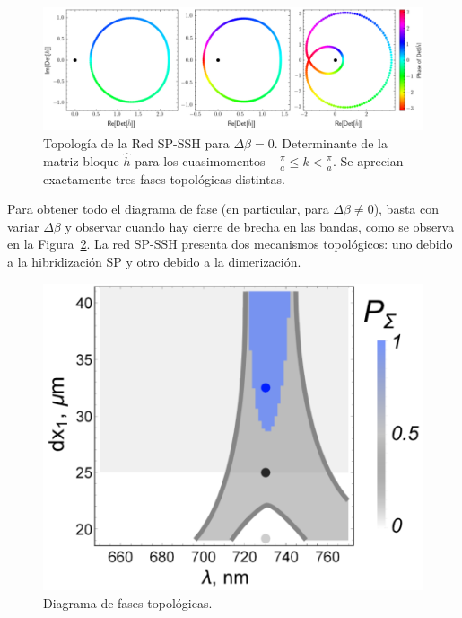 \begin{figure}[H]
	\centering
	\includegraphics[width=\linewidth]{media/sp-ssh-012.png}
	\caption[Topología de la Red SP-SSH para $\Delta\beta = 0$.]{Topología de la Red SP-SSH para $\Delta\beta = 0$. Determinante de la matriz-bloque $\hat{h}$ para los cuasimomentos $-\frac{\pi}{a} \le k  < \frac{\pi}{a}$. Se aprecian exactamente tres fases topológicas distintas. \label{fig:sp-wilson}}
\end{figure} \vspace{-8ex}
Para obtener todo el diagrama de fase (en particular, para $\Delta \beta \neq 0$), basta con variar $\Delta \beta$ y observar cuando hay cierre de brecha en las bandas, como se observa en la Figura~\ref{fig:sp-ssh-phase-diagram}.  La red SP-SSH presenta dos mecanismos topológicos: uno debido a la hibridización SP y otro debido a la dimerización.
\begin{figure}[H]
	\centering
	\includegraphics[width=0.4\linewidth]{media/sp-ssh-phase-diagram.png}
	\caption{Diagrama de fases topológicas. \label{fig:sp-ssh-phase-diagram}}
\end{figure} \vspace{-2ex}
